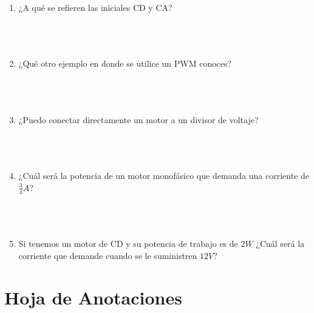 	\begin{enumerate}
		\item ¿A qué se refieren las iniciales CD y CA?\\ \\ \\ \\
		\item ¿Qué otro ejemplo en donde se utilice un PWM conoces?\\ \\ \\ \\
		\item ¿Puedo conectar directamente un motor a un divisor de voltaje?\\ \\ \\ \\
		\item ¿Cuál será la potencia de un motor monofásico que demanda una corriente de $\frac{3}{4} A$?\\ \\ \\ \\
		\item Si tenemos un motor de CD y su potencia de trabajo es de $2 W$ ¿Cuál será la corriente que demande cuando se le suministren $12 V$?\\
	\end{enumerate}


\clearpage
\section{Hoja de Anotaciones}

